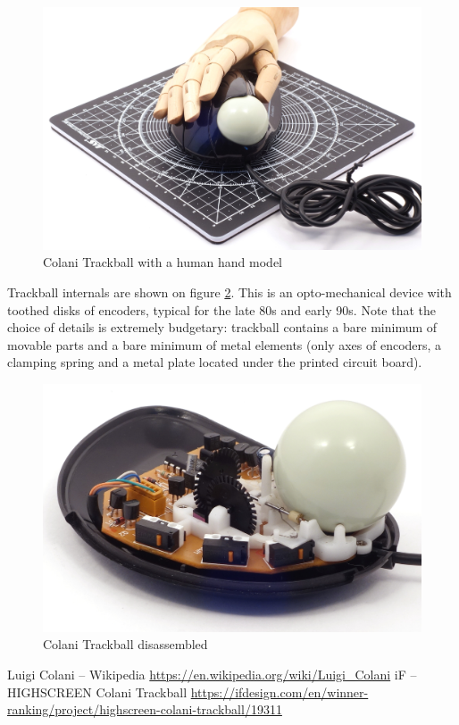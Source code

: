 \documentclass[11pt, a4paper]{article}
\begin{document}
\begin{figure}[h]
    \centering
    \includegraphics[scale=0.15]{1993_colani_trackball/hand_60.jpg}
    \caption{Colani Trackball with a human hand model}
    \label{fig:ColaniHand}
\end{figure}

Trackball internals are shown on figure \ref{fig:ColaniInside}. This is an opto-mechanical device with toothed disks of encoders, typical for the late 80s and early 90s. Note that the choice of details is extremely budgetary: trackball contains a bare minimum of movable parts and a bare minimum of metal elements (only axes of encoders, a clamping spring and a metal plate located under the printed circuit board).

\begin{figure}[h]
    \centering
    \includegraphics[scale=0.8]{1993_colani_trackball/inside_30.jpg}
    \caption{Colani Trackball disassembled}
    \label{fig:ColaniInside}
\end{figure}

\begin{thebibliography}{9}
     Luigi Colani – Wikipedia \url{https://en.wikipedia.org/wiki/Luigi_Colani}
     iF – HIGHSCREEN Colani Trackball \url{https://ifdesign.com/en/winner-ranking/project/highscreen-colani-trackball/19311}
\end{thebibliography}
\end{document}
